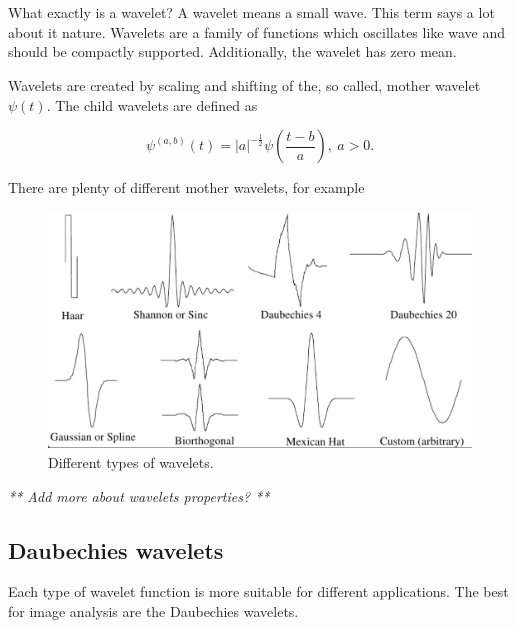 \chapter{}
What exactly is a wavelet? A wavelet means a small wave. This term says a lot about it nature. Wavelets are a family of functions which oscillates like wave and should be compactly supported. Additionally, the wavelet has zero mean.

\begin{defn}
Wavelets are created by scaling and shifting of the, so called, mother wavelet $\psi(t)$. The child wavelets are defined as

\begin{equation}
\label{eq:wavelets}
\psi^{(a,b)}(t)=|a|^{-\frac{1}{2}} \psi\left(\frac{t-b}{a}\right),\ a>0. 
\end{equation}

\end{defn}


There are plenty of different mother wavelets, for example

\begin{figure}[h]
	\centering
	\includegraphics[width=\textwidth]{wavelets_with_bottom_line.png}
	\caption{Different types of wavelets.}
	\label{fig:wavelets}
\end{figure}

\textit{** Add more about wavelets properties? **}


\section{Daubechies wavelets}

Each type of wavelet function is more suitable for different applications. The best for image analysis are the Daubechies wavelets. 


